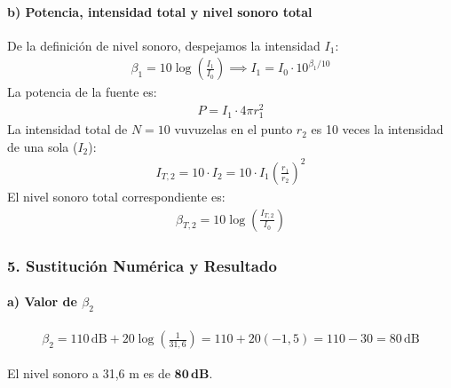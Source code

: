 \paragraph*{b) Potencia, intensidad total y nivel sonoro total}
De la definición de nivel sonoro, despejamos la intensidad $I_1$:
\begin{gather}
    \beta_1 = 10 \log\left(\frac{I_1}{I_0}\right) \implies I_1 = I_0 \cdot 10^{\beta_1/10}
\end{gather}
La potencia de la fuente es:
\begin{gather}
    P = I_1 \cdot 4\pi r_1^2
\end{gather}
La intensidad total de $N=10$ vuvuzelas en el punto $r_2$ es 10 veces la intensidad de una sola ($I_2$):
\begin{gather}
    I_{T,2} = 10 \cdot I_2 = 10 \cdot I_1 \left(\frac{r_1}{r_2}\right)^2
\end{gather}
El nivel sonoro total correspondiente es:
\begin{gather}
    \beta_{T,2} = 10 \log\left(\frac{I_{T,2}}{I_0}\right)
\end{gather}

\subsubsection*{5. Sustitución Numérica y Resultado}
\paragraph*{a) Valor de $\beta_2$}
\begin{gather}
    \beta_2 = 110 \, \text{dB} + 20 \log\left(\frac{1}{31,6}\right) = 110 + 20(-1,5) = 110 - 30 = 80 \, \text{dB}
\end{gather}
\begin{cajaresultado}
    El nivel sonoro a 31,6 m es de $\boldsymbol{80 \, \textbf{dB}}$.
\end{cajaresultado}

